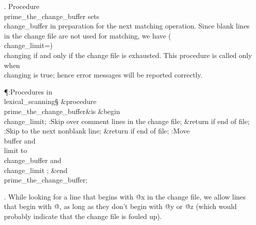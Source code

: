 . Procedure \\{prime\_the\_change\_buffer} sets \\{change\_buffer} in
preparation
for the next matching operation. Since blank lines in the change file are
not used for matching, we have \?(\?\\{change\_limit}\?=\?)\W\R\?%
\\{changing} if and
only if the change file is exhausted. This procedure is called only
when \\{changing} is true; hence error messages will be reported correctly.

\Y\P\?\4:Procedures in \\{lexical\_scanning}\X\mathrel{+}\S\?\6
\&{procedure}\8\1\\{prime\_the\_change\_buffer}\2\8\&{is}\8\1\6
\4\&{begin}\6
\\{change\_limit}\?\K{};\6
:Skip over comment lines in the change file; \&{return} if end of file\X;\6
:Skip to the next nonblank line; \&{return} if end of file\X;\6
:Move \\{buffer} and \\{limit} to \\{change\_buffer} and \\{change\_limit}%
\X;\2\6
\&{end}\8\\{prime\_the\_change\_buffer};\par
\fi

. While looking for a line that begins with \.{@x} in the change file,
we allow lines that begin with \.{@}, as long as they don't begin with
\.{@y} or \.{@z} (which would probably indicate that the change file is
fouled up).

